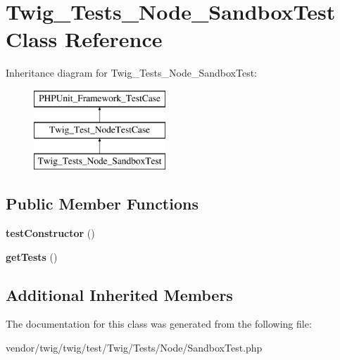 \hypertarget{classTwig__Tests__Node__SandboxTest}{}\section{Twig\+\_\+\+Tests\+\_\+\+Node\+\_\+\+Sandbox\+Test Class Reference}
\label{classTwig__Tests__Node__SandboxTest}
Inheritance diagram for Twig\+\_\+\+Tests\+\_\+\+Node\+\_\+\+Sandbox\+Test\+:\begin{figure}[H]
\begin{center}
\leavevmode
\includegraphics[height=3.000000cm]{classTwig__Tests__Node__SandboxTest}
\end{center}
\end{figure}
\subsection*{Public Member Functions}
\begin{DoxyCompactItemize}
\item 
{\bfseries test\+Constructor} ()\hypertarget{classTwig__Tests__Node__SandboxTest_a8c509e03fba0d602de189f1b682edc84}{}\label{classTwig__Tests__Node__SandboxTest_a8c509e03fba0d602de189f1b682edc84}

\item 
{\bfseries get\+Tests} ()\hypertarget{classTwig__Tests__Node__SandboxTest_a2b97833a452c0d67031d151557fbb82b}{}\label{classTwig__Tests__Node__SandboxTest_a2b97833a452c0d67031d151557fbb82b}

\end{DoxyCompactItemize}
\subsection*{Additional Inherited Members}


The documentation for this class was generated from the following file\+:\begin{DoxyCompactItemize}
\item 
vendor/twig/twig/test/\+Twig/\+Tests/\+Node/Sandbox\+Test.\+php\end{DoxyCompactItemize}
